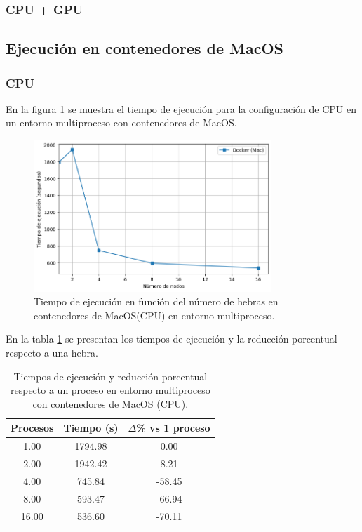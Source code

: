 \subsubsection{CPU + GPU}

\subsection{Ejecución en contenedores de MacOS}
\subsubsection{CPU}

En la figura \ref{fig:multi-node_mac_docker_time} se muestra el tiempo de ejecución para la configuración de CPU en un entorno multiproceso con contenedores de MacOS.

\begin{figure}[ht]
    \centering
    \includegraphics[width=0.8\textwidth]{imagenes/cap5/multi-node_mac_docker_time.png}
    \caption{Tiempo de ejecución en función del número de hebras en contenedores de MacOS(CPU) en entorno multiproceso.}
    \label{fig:multi-node_mac_docker_time}
\end{figure}

En la tabla \ref{tab:multi-node_mac_docker} se presentan los tiempos de ejecución y la reducción porcentual respecto a una hebra.

\begin{table}[ht]
    \centering
    \begin{tabular}{|c|c|c|}
        \hline
        \textbf{Procesos} & \textbf{Tiempo (s)} & \textbf{$\Delta$\% vs 1 proceso} \\
        \hline
        1.00              & 1794.98             & 0.00                             \\
        2.00              & 1942.42             & 8.21                             \\
        4.00              & 745.84              & -58.45                           \\
        8.00              & 593.47              & -66.94                           \\
        16.00             & 536.60              & -70.11                           \\
        \hline
    \end{tabular}
    \caption{Tiempos de ejecución y reducción porcentual respecto a un proceso en entorno multiproceso con contenedores de MacOS (CPU).}
    \label{tab:multi-node_mac_docker}
\end{table}

